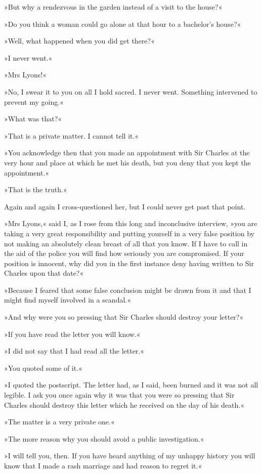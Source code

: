 »But why a rendezvous in the garden instead of a visit to the house?«

»Do you think a woman could go alone at that hour to a bachelor's house?«

»Well, what happened when you did get there?«

»I never went.«

»Mrs Lyons!«

»No, I swear it to you on all I hold sacred. I never went. Something intervened to prevent my going.«

»What was that?«

»That is a private matter. I cannot tell it.«

»You acknowledge then that you made an appointment with Sir Charles at the very hour and place at which he met his death, but you deny that you kept the appointment.«

»That is the truth.«

Again and again I cross-questioned her, but I could never get past that point.

»Mrs Lyons,« said I, as I rose from this long and inconclusive interview, »you are taking a very great responsibility and putting yourself in a very false position by not making an absolutely clean breast of all that you know. If I have to call in the aid of the police you will find how seriously you are compromised. If your position is innocent, why did you in the first instance deny having written to Sir Charles upon that date?«

»Because I feared that some false conclusion might be drawn from it and that I might find myself involved in a scandal.«

»And why were you so pressing that Sir Charles should destroy your letter?«

»If you have read the letter you will know.«

»I did not say that I had read all the letter.«

»You quoted some of it.«

»I quoted the postscript. The letter had, as I said, been burned and it was not all legible. I ask you once again why it was that you were so pressing that Sir Charles should destroy this letter which he received on the day of his death.«

»The matter is a very private one.«

»The more reason why you should avoid a public investigation.«

»I will tell you, then. If you have heard anything of my unhappy history you will know that I made a rash marriage and had reason to regret it.«

